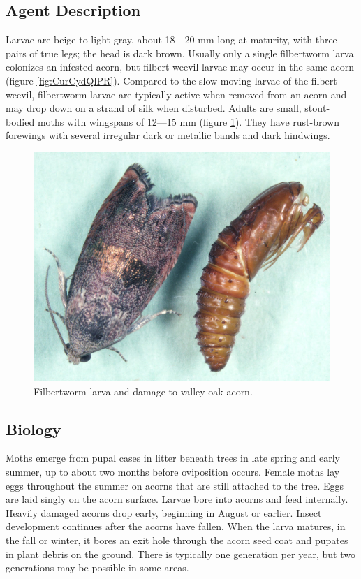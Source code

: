 \documentclass[
]{book}
\begin{document}
\subsection*{Agent Description}\label{agent-description-1}

Larvae are beige to light gray, about 18---20 mm long at maturity, with three pairs of true legs; the head is dark brown. Usually only a single filbertworm larva colonizes an infested acorn, but filbert weevil larvae may occur in the same acorn (figure \ref{fig:CurCydQlPR}). Compared to the slow-moving larvae of the filbert weevil, filbertworm larvae are typically active when removed from an acorn and may drop down on a strand of silk when disturbed. Adults are small, stout-bodied moths with wingspans of 12---15 mm (figure \ref{fig:CylaAdPuDO}). They have rust-brown forewings with several irregular dark or metallic bands and dark hindwings.



\begin{figure}

{\centering \includegraphics[width=0.8\linewidth]{images/Insect-acorn/Cydlat-Ad-Pupcase-DOwens} 

}

\caption{Filbertworm larva and damage to valley oak acorn.}\label{fig:CylaAdPuDO}
\end{figure}

\subsection*{Biology}\label{biology-1}

Moths emerge from pupal cases in litter beneath trees in late spring and early summer, up to about two months before oviposition occurs. Female moths lay eggs throughout the summer on acorns that are still attached to the tree. Eggs are laid singly on the acorn surface. Larvae bore into acorns and feed internally. Heavily damaged acorns drop early, beginning in August or earlier. Insect development continues after the acorns have fallen. When the larva matures, in the fall or winter, it bores an exit hole through the acorn seed coat and pupates in plant debris on the ground. There is typically one generation per year, but two generations may be possible in some areas.
\end{document}
